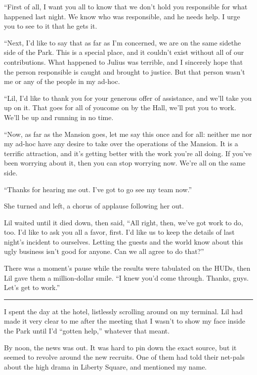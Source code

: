 “First of all, I want you all to know that we don't hold you
responsible for what happened last night. We know who was
responsible, and he needs help. I urge you to see to it that he
gets it.

“Next, I'd like to say that as far as I'm concerned, we are on the
same side{\dash}the side of the Park. This is a special place, and it
couldn't exist without all of our contributions. What happened to
Julius was terrible, and I sincerely hope that the person
responsible is caught and brought to justice. But that person
wasn't me or any of the people in my ad-hoc.

“Lil, I'd like to thank you for your generous offer of assistance,
and we'll take you up on it. That goes for all of you{\dash}come on by
the Hall, we'll put you to work. We'll be up and running in no
time.

“Now, as far as the Mansion goes, let me say this once and for all:
neither me nor my ad-hoc have any desire to take over the
operations of the Mansion. It is a terrific attraction, and it's
getting better with the work you're all doing. If you've been
worrying about it, then you can stop worrying now. We're all on the
same side.

“Thanks for hearing me out. I've got to go see my team now.”

She turned and left, a chorus of applause following her out.

Lil waited until it died down, then said, “All right, then, we've
got work to do, too. I'd like to ask you all a favor, first. I'd
like us to keep the details of last night's incident to ourselves.
Letting the guests and the world know about this ugly business
isn't good for anyone. Can we all agree to do that?”

There was a moment's pause while the results were tabulated on the
HUDs, then Lil gave them a million-dollar smile. “I knew you'd come
through. Thanks, guys. Let's get to work.”

\begin{center}\rule{3in}{0.4pt}\end{center}

I spent the day at the hotel, listlessly scrolling around on my
terminal. Lil had made it very clear to me after the meeting that I
wasn't to show my face inside the Park until I'd “gotten help,”
whatever that meant.

By noon, the news was out. It was hard to pin down the exact
source, but it seemed to revolve around the new recruits. One of
them had told their net-pals about the high drama in Liberty
Square, and mentioned my name.

